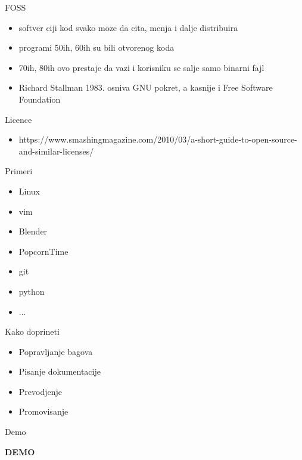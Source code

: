 \documentclass{beamer}
\begin{document}
	\begin{frame}{FOSS}
		\begin{itemize}
		\item softver ciji kod svako moze da cita, menja i dalje distribuira
		\item programi 50ih, 60ih su bili otvorenog koda
		\item 70ih, 80ih ovo prestaje da vazi i korisniku se salje samo binarni fajl
		\item Richard Stallman 1983. osniva GNU pokret, a kasnije i Free Software Foundation
		\end{itemize}
	\end{frame}
	
	\begin{frame}{Licence}
		\begin{itemize}
		\item https://www.smashingmagazine.com/2010/03/a-short-guide-to-open-source-and-similar-licenses/
		\end{itemize}
	\end{frame}
	
	\begin{frame}{Primeri}
		\begin{itemize}
		\item Linux
		\item vim
		\item Blender
		\item PopcornTime
		\item git
		\item python
		\item ...
		\end{itemize}
	\end{frame}
	
	\begin{frame}{Kako doprineti}
		\begin{itemize}
		\item Popravljanje bagova
		\item Pisanje dokumentacije
		\item Prevodjenje
		\item Promovisanje
		\end{itemize}
	\end{frame}
	
	\begin{frame}{Demo}
		\begin{center}
			\textbf{DEMO}
		\end{center}
	\end{frame}	
\end{document}
